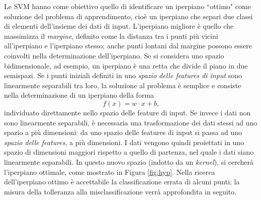 \documentclass[oneside, openany]{book}
\begin{document}
	Le SVM hanno come obiettivo quello di identificare un iperpiano ``ottimo" come soluzione del problema di apprendimento, cioè un iperpiano che separi due classi di elementi dell'insieme dei dati di input. L'iperpiano migliore è quello che massimizza il \textit{margine}, definito come la distanza tra i punti più vicini all'iperpiano e l'iperpiano stesso; anche punti lontani dal margine possono essere coinvolti nella determinazione dell'iperpiano. Se si considera uno spazio bidimensionale, ad esempio, un iperpiano è una retta che divide il piano in due semispazi. Se i punti iniziali definiti in uno \textit{spazio delle features di input} sono linearmente separabili tra loro, la soluzione al problema è semplice e consiste nella determinazione di un iperpiano della forma
	\[
		f(x) = w\cdot x +b\text{,}
	\]
	individuato direttamente nello spazio delle feature di input.
	Se invece i dati non sono linearmente separabili, è necessaria una trasformazione dei dati stessi ad uno spazio a più dimensioni: da uno spazio delle features di input si passa ad uno \textit{spazio delle features}, a più dimensioni. I dati vengono quindi proiettati in uno spazio di dimensioni maggiori rispetto a quello di partenza, nel quale i dati siano linearmente separabili. In questo nuovo spazio (indotto da un \textit{kernel}), si cercherà l'iperpiano ottimale, come mostrato in Figura \ref{fig:hyp}. Nella ricerca dell'iperpiano ottimo è accettabile la classificazione errata di alcuni punti; la misura della tolleranza alla misclassificazione verrà approfondita in seguito.
\end{document}
